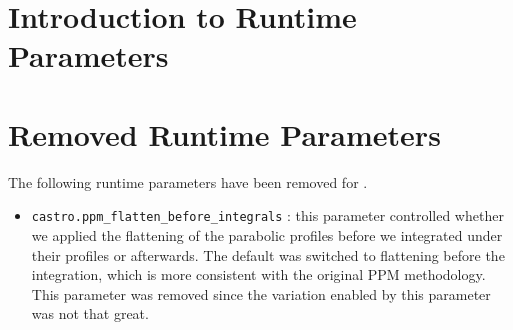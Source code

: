 \section{Introduction to Runtime Parameters}



\section{Removed Runtime Parameters}

The following runtime parameters have been removed for \castro.
\begin{itemize}
\item {\tt castro.ppm\_flatten\_before\_integrals} : this parameter
  controlled whether we applied the flattening of the parabolic
  profiles before we integrated under their profiles or afterwards.
  The default was switched to flattening before the integration,
  which is more consistent with the original PPM methodology.  This
  parameter was removed since the variation enabled by this parameter
  was not that great.
\end{itemize}
